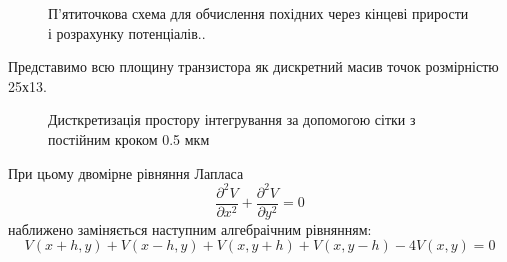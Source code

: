 \documentclass[14pt,a4paper]{scrartcl}
\begin{document}
\begin{center}
\begin{figure}[h]
\caption{П'ятиточкова схема для обчислення похідних через кінцеві прирости і розрахунку потенціалів..}
\label{ris:image5}
\end{figure}
\end{center}

\newpage
Представимо всю площину транзистора як  дискретний масив точок розмірністю 25х13. 

\begin{center}
\begin{figure}[h]
\caption[wec]{Дисткретизація простору інтегрування за допомогою сітки з постійним кроком 0.5 мкм\footnotemark}
\label{ris:image}
\end{figure}
\end{center}


При цьому двомірне рівняння Лапласа
\begin{equation}
\dfrac{\partial^2 V}{\partial x^2} +\dfrac{\partial^2 V}{\partial y^2} =0
\label{eq:ref}
\end{equation}
наближено заміняється наступним алгебраічним рівнянням:
\begin{equation}
V ( x + h, y ) + V ( x-h, y ) + V ( x, y + h ) + V ( x, y-h ) - 4 V ( x, y ) = 0
\label{eq:ref}
\end{equation}
\end{document}
